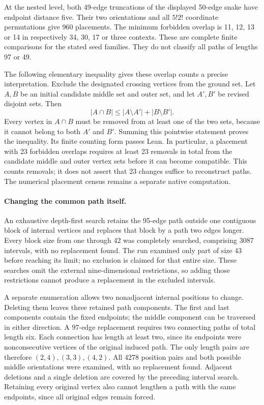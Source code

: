 \documentclass[11pt,a4paper]{article}
\theoremstyle{definition}
\theoremstyle{remark}
\begin{document}
At the nested level, both 49-edge truncations of the displayed 50-edge
snake have endpoint distance five. Their two orientations and all
$5!2!$ coordinate permutations give 960 placements. The minimum
forbidden overlap is 11, 12, 13 or 14 in respectively 34, 30, 17 or
three contexts. These are complete finite comparisons for the stated
seed families. They do not classify all paths of lengths 97 or 49.

The following elementary inequality gives these overlap counts a
precise interpretation. Exclude the designated crossing vertices from
the ground set. Let $A,B$ be an initial candidate middle set and outer
set, and let $A',B'$ be revised disjoint sets. Then
\[
\boxed{|A\cap B|\le |A\setminus A'|+|B\setminus B'|.}
\]
Every vertex in $A\cap B$ must be removed from at least one of the two
sets, because it cannot belong to both $A'$ and $B'$. Summing this
pointwise statement proves the inequality. Its finite counting form
passes Lean. In particular, a placement with 23 forbidden overlaps
requires at least 23 removals in total from the candidate middle and
outer vertex sets before it can become compatible. This counts removals;
it does not assert that 23 changes suffice to reconstruct paths.
The numerical placement census remains a separate native computation.

\paragraph{Changing the common path itself.}
An exhaustive depth-first search retains the 95-edge path outside one
contiguous block of internal vertices and replaces that block by a path
two edges longer. Every block size from one through 42 was completely
searched, comprising 3087 intervals, with no replacement found.
The run examined only part of size 43 before reaching its limit; no
exclusion is claimed for that entire size. These searches omit the
external nine-dimensional restrictions, so adding those restrictions
cannot produce a replacement in the excluded intervals.

A separate enumeration allows two nonadjacent internal positions to
change. Deleting them leaves three retained path components. The first
and last components contain the fixed endpoints; the middle component
can be traversed in either direction. A 97-edge replacement requires
two connecting paths of total length six. Each connection has length
at least two, since its endpoints were nonconsecutive vertices of the
original induced path. The only length pairs are therefore
$(2,4),(3,3),(4,2)$. All 4278 position pairs and both possible middle
orientations were examined, with no replacement found. Adjacent
deletions and a single deletion are covered by the preceding interval
search. Retaining every original vertex also cannot lengthen a path
with the same endpoints, since all original edges remain forced.
\end{document}
